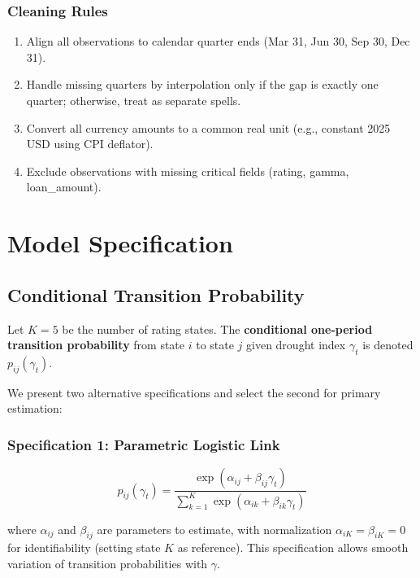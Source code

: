 \documentclass[12pt,a4paper]{article}
\begin{document}
\subsubsection*{Cleaning Rules}
\begin{enumerate}[noitemsep]
    \item Align all observations to calendar quarter ends (Mar 31, Jun 30, Sep 30, Dec 31).
    \item Handle missing quarters by interpolation only if the gap is exactly one quarter; otherwise, treat as separate spells.
    \item Convert all currency amounts to a common real unit (e.g., constant 2025 USD using CPI deflator).
    \item Exclude observations with missing critical fields (rating, gamma, loan\_amount).
\end{enumerate}

\section{Model Specification}

\subsection{Conditional Transition Probability}

Let $K = 5$ be the number of rating states. The \textbf{conditional one-period transition probability} from state $i$ to state $j$ given drought index $\gamma_t$ is denoted $p_{ij}(\gamma_t)$.

We present two alternative specifications and select the second for primary estimation:

\subsubsection{Specification 1: Parametric Logistic Link}

\begin{equation}
p_{ij}(\gamma_t) = \frac{\exp(\alpha_{ij} + \beta_{ij}\gamma_t)}{\sum_{k=1}^K \exp(\alpha_{ik} + \beta_{ik}\gamma_t)}
\end{equation}

where $\alpha_{ij}$ and $\beta_{ij}$ are parameters to estimate, with normalization $\alpha_{iK} = \beta_{iK} = 0$ for identifiability (setting state $K$ as reference). This specification allows smooth variation of transition probabilities with $\gamma$.
\end{document}

